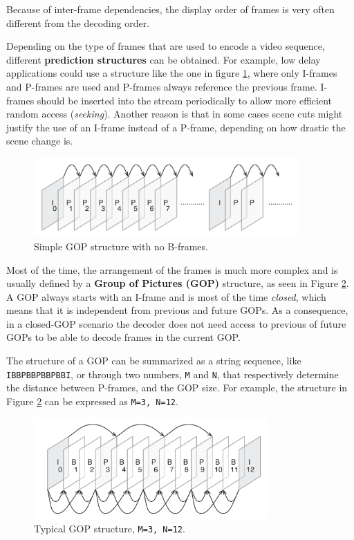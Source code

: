 Because of inter-frame dependencies, the display order of frames is very often different from the decoding order.

Depending on the type of frames that are used to encode a video sequence, different \textbf{prediction structures} can be obtained. For example, low delay applications could use a structure like the one in figure \ref{fig:codec_gop1}, where only I-frames and P-frames are used and P-frames always reference the previous frame. I-frames should be inserted into the stream periodically to allow more efficient random access (\textit{seeking}). Another reason is that in some cases scene cuts might justify the use of an I-frame instead of a P-frame, depending on how drastic the scene change is.

\begin{figure}
	\centering
	
	\includegraphics[width=0.9\textwidth]{res/gop1.png}
	
	\caption{Simple GOP structure with no B-frames.}
	\label{fig:codec_gop1}
\end{figure}

Most of the time, the arrangement of the frames is much more complex and is usually defined by a \textbf{Group of Pictures (GOP)} structure, as seen in Figure \ref{fig:codec_gop2}. A GOP always starts with an I-frame and is most of the time \textit{closed}, which means that it is independent from previous and future GOPs. As a consequence, in a closed-GOP scenario the decoder does not need access to previous of future GOPs to be able to decode frames in the current GOP.

The structure of a GOP can be summarized as a string sequence, like \texttt{IBBPBBPBBPBBI}, or through two numbers, \texttt{M} and \texttt{N}, that respectively determine the distance between P-frames, and the GOP size. For example, the structure in Figure \ref{fig:codec_gop2} can be expressed as \texttt{M=3, N=12}.

\begin{figure}
	\centering
	
	\includegraphics[width=0.8\textwidth]{res/gop2.png}
	
	\caption{Typical GOP structure, \texttt{M=3, N=12}.}
	\label{fig:codec_gop2}
\end{figure}

